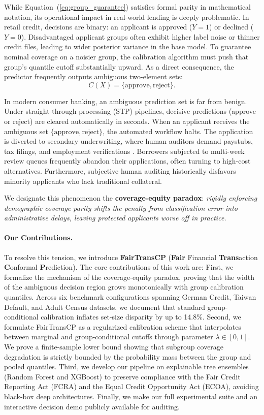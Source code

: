 \documentclass[twoside]{article}
\begin{document}
While Equation~(\ref{eq:group_guarantee}) satisfies formal parity in mathematical notation, its operational impact in real-world lending is deeply problematic. In retail credit, decisions are binary: an applicant is approved ($Y=1$) or declined ($Y=0$). Disadvantaged applicant groups often exhibit higher label noise or thinner credit files, leading to wider posterior variance in the base model. To guarantee nominal coverage on a noisier group, the calibration algorithm must push that group's quantile cutoff substantially upward. As a direct consequence, the predictor frequently outputs ambiguous two-element sets:
\begin{equation}
C(X) = \{\text{approve}, \text{reject}\}.
\end{equation}

In modern consumer banking, an ambiguous prediction set is far from benign. Under straight-through processing (STP) pipelines, decisive predictions ({approve} or {reject}) are cleared automatically in seconds. When an applicant receives the ambiguous set $\{\text{approve}, \text{reject}\}$, the automated workflow halts. The application is diverted to secondary underwriting, where human auditors demand paystubs, tax filings, and employment verifications \citep{charpentier2024insurance, cresswell2025conformal}. Borrowers subjected to multi-week review queues frequently abandon their applications, often turning to high-cost alternatives. Furthermore, subjective human auditing historically disfavors minority applicants who lack traditional collateral.

We designate this phenomenon the \textbf{coverage-equity paradox}: \emph{rigidly enforcing demographic coverage parity shifts the penalty from classification error into administrative delays, leaving protected applicants worse off in practice.}

\paragraph{Our Contributions.}
To resolve this tension, we introduce \textbf{FairTransCP} (\textbf{Fair} Financial \textbf{Trans}action \textbf{C}onformal \textbf{P}rediction). The core contributions of this work are:
First, we formalize the mechanism of the coverage-equity paradox, proving that the width of the ambiguous decision region grows monotonically with group calibration quantiles. Across six benchmark configurations spanning German Credit, Taiwan Default, and Adult Census datasets, we document that standard group-conditional calibration inflates set-size disparity by up to 14.8\%.
Second, we formulate FairTransCP as a regularized calibration scheme that interpolates between marginal and group-conditional cutoffs through parameter $\lambda \in [0, 1]$. We prove a finite-sample lower bound showing that subgroup coverage degradation is strictly bounded by the probability mass between the group and pooled quantiles.
Third, we develop our pipeline on explainable tree ensembles (Random Forest and XGBoost) to preserve compliance with the Fair Credit Reporting Act (FCRA) and the Equal Credit Opportunity Act (ECOA), avoiding black-box deep architectures.
Finally, we make our full experimental suite and an interactive decision demo publicly available for auditing.
\end{document}
